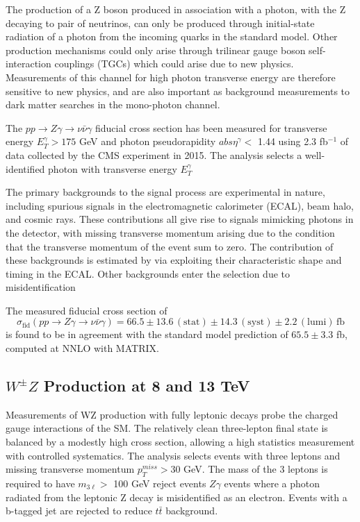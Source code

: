 \documentclass[10pt]{article}
\begin{document}
The production of a Z boson produced in association with a photon,
with the Z decaying to pair of neutrinos, can only be produced through
initial-state radiation of a photon from the incoming quarks in the standard model.
Other production mechanisms could only arise through trilinear gauge boson 
self-interaction couplings (TGCs) which could arise due to new physics. 
Measurements of this channel for high photon transverse energy are therefore
sensitive to new physics, and are also important as background measurements to
dark matter searches in the mono-photon channel.

The $pp \rightarrow Z\gamma \rightarrow \nu\bar{\nu}\gamma$ fiducial cross section 
has been measured for transverse energy $E_{T}^{\gamma} > 175$ GeV and photon pseudorapidity
$abs{\eta^{\gamma}} < $ 1.44 using 2.3 fb$^{-1}$ of data collected by the CMS experiment in 2015.
The analysis selects a well-identified photon with transverse energy $E_{T}^{\gamma}$

The primary backgrounds to the signal process are experimental in nature, including 
spurious signals in the electromagnetic calorimeter (ECAL), beam halo, and cosmic rays. 
These contributions all give rise to signals mimicking photons in the detector, 
with missing transverse momentum arising due to the 
condition that the transverse momentum of the event sum to zero. The contribution of
these backgrounds is estimated
by via exploiting their characteristic shape and timing in the ECAL. Other backgrounds 
enter the selection due to misidentification

The measured fiducial cross section of
\begin{equation}
  \sigma_{\mathrm{fid}}(pp \rightarrow Z\gamma \rightarrow \nu\bar{\nu}\gamma) = 66.5 \pm 13.6 \, \mathrm{(stat)} \pm 14.3 \, 
        \mathrm{(syst)} \pm 2.2 \, \mathrm{(lumi)} \,\mathrm{fb}
\end{equation}
is found to be in agreement with the standard model prediction of $65.5 \pm 3.3$ fb, computed at
NNLO with MATRIX. \cite{bleh}

\subsection{$W^{\pm}Z$ Production at 8 and 13 TeV}

Measurements of WZ production with fully leptonic decays probe the charged
gauge interactions of the SM. The relatively clean three-lepton final state
is balanced by a modestly high cross section, allowing a high statistics measurement 
with controlled systematics. The analysis selects events with three leptons and 
missing transverse momentum $p_{T}^{miss} > 30$ GeV. The mass of the 3 leptons
is required to have $m_{3\ell} > $ 100 GeV reject events $Z\gamma$ events where a photon
radiated from the leptonic Z decay is misidentified as an electron. Events with
a b-tagged jet are rejected to reduce $t\bar{t}$ background.
\end{document}
